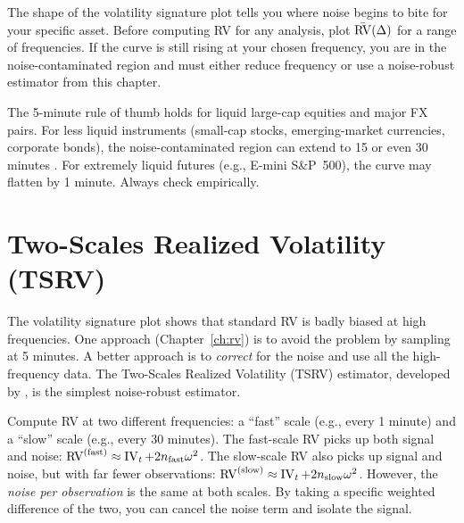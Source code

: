 \begin{keyidea}
The shape of the volatility signature plot tells you where noise begins to bite for your specific asset.
Before computing RV for any analysis, plot $\bar{\operatorname{RV}}(\Delta)$ for a range of frequencies.
If the curve is still rising at your chosen frequency, you are in the noise-contaminated region and must either reduce frequency or use a noise-robust estimator from this chapter.
\end{keyidea}

\begin{warning}
The 5-minute rule of thumb holds for liquid large-cap equities and major FX pairs.
For less liquid instruments (small-cap stocks, emerging-market currencies, corporate bonds), the noise-contaminated region can extend to 15 or even 30 minutes \citep{HansenLunde2006}.
For extremely liquid futures (e.g., E-mini S\&P~500), the curve may flatten by 1 minute.
Always check empirically.
\end{warning}


\section{Two-Scales Realized Volatility (TSRV)}
\label{sec:tsrv}

The volatility signature plot shows that standard RV is badly biased at high frequencies.
One approach (Chapter~\ref{ch:rv}) is to avoid the problem by sampling at 5 minutes.
A better approach is to \emph{correct} for the noise and use all the high-frequency data.
The Two-Scales Realized Volatility (TSRV) estimator, developed by \citet{ZhangMyklandAitSahalia2005}, is the simplest noise-robust estimator.

\begin{intuition}
Compute RV at two different frequencies: a ``fast'' scale (e.g., every 1 minute) and a ``slow'' scale (e.g., every 30 minutes).
The fast-scale RV picks up both signal and noise: $\operatorname{RV}^{(\text{fast})} \approx \operatorname{IV}_t + 2n_{\text{fast}}\omega^2$.
The slow-scale RV also picks up signal and noise, but with far fewer observations: $\operatorname{RV}^{(\text{slow})} \approx \operatorname{IV}_t + 2n_{\text{slow}}\omega^2$.
However, the \emph{noise per observation} is the same at both scales.
By taking a specific weighted difference of the two, you can cancel the noise term and isolate the signal.
\end{intuition}

